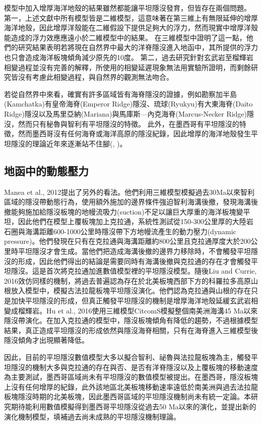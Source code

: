 模型中加入增厚海洋地殼的結果雖然都能讓平坦隱沒發育，但皆存在兩個問題。
第一，上述文獻中所有模型皆是二維模型，這意味著在第三維上有無限延伸的增厚海洋地殼，因此增厚洋殼能在二維假設下提供足夠大的浮力，然而現實中增厚洋殼能造成的浮力效應應遠小於二維模型中的結果。
\citealp{florez2019impact}在三維模型中證明了這一點，他們的研究結果表明若將現在自然界中最大的洋脊隱沒進入地函中，其所提供的浮力也只會造成海洋板塊傾角減少原先的10度。
第二，過去研究針對玄武岩至榴輝岩相變過程並沒有完善的解釋，\citealp{van2002role}所使用的相變延遲現象無法用實驗所證明，而剩餘研究皆沒有考慮此相變過程，與自然界的觀測無法吻合。

若從自然界中來看，確實有許多區域皆有海脊隱沒的證據，例如勘察加半島(Kamchatka)有皇帝海脊(Emperor Ridge)隱沒、琉球(Ryukyu)有大東海脊(Daito Ridge)隱沒以及馬里亞納(Mariana)與馬庫斯—內克海脊(Marcus-Necker Ridge)隱沒，然而只有秘魯與智利有平坦隱沒的特徵。
此外，在墨西哥有平坦隱沒的特徵，然而墨西哥沒有任何海脊或海洋高原的隱沒紀錄，因此增厚的海洋地殼發生平坦隱沒的理論近年來逐漸站不住腳(\citealp{schellart2020control}, \citealp{Schellart2021})。

\subsection{地函中的動態壓力}
Manea et al., 2012提出了另外的看法。他們利用三維模型模擬過去30Ma以來智利區域的隱沒帶動態行為，使用額外施加的邊界條件強迫智利海溝後撤，發現海溝後撤能夠施加給隱沒板塊的地幔流吸力(suction)不足以讓巨大厚重的海洋板塊變平坦，因此他們在模型上覆板塊加上克拉通，系統性測試從150-300公里厚的大陸岩石圈與海溝距離600-1000公里時隱沒帶下方地幔流產生的動力壓力(dynamic pressure)。他們發現在只有在克拉通與海溝距離約800公里且克拉通厚度大於200公里時平坦隱沒才會生成。當他們把造成海溝後撤的邊界力移除時，不會觸發平坦隱沒的形成，因此他們得出的結論是需要同時有海溝後撤與克拉通的存在才會觸發平坦隱沒。這是首次將克拉通加進數值模型裡的平坦隱沒模型。隨後Liu and Currie, 2016效仿同樣的機制，將過去普遍認為存在於北美板塊西部下方的科羅拉多高原山根放入模型中，模擬古法拉龍板塊平坦隱沒演化。他們認為克拉通與山根的存在只是加快平坦隱沒的形成，但真正觸發平坦隱沒的機制是增厚海洋地殼延緩玄武岩相變成榴輝岩。Hu et al., 2016使用三維模型CitcomS模擬整個南美洲海溝45 Ma以來隱沒帶演化。在加入克拉通的模型中，隱沒板塊傾角有降低的趨勢，不過根據模型結果，真正造成平坦隱沒的形成依然與隱沒海脊相關，只有在海脊進入三維模型後隱沒傾角才出現顯著降低。

因此，目前的平坦隱沒數值模型大多以擬合智利、祕魯與法拉龍板塊為主，觸發平坦隱沒的機制大多與克拉通的存在與否、是否有洋脊隱沒以及上覆板塊的移動速度為主要測試，墨西哥區域尚未有平坦隱沒的數值模型被提出。在墨西哥，隱沒板塊上沒有任何增厚的紀錄，此外該地區北美板塊移動速率遠低於南美洲與過去法拉龍板塊隱沒時期的北美板塊，因此墨西哥區域的平坦隱沒機制尚未有統一定論。本研究期待能利用數值模擬得到墨西哥平坦隱沒從過去50 Ma以來的演化，並提出新的演化機制模型，填補過去尚未成熟的平坦隱沒機制理論。

